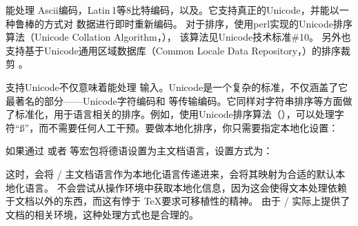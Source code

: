 \biber 能处理 Ascii编码，Latin\,1等8比特编码，以及\utf 。它支持真正的Unicode，并能以一种鲁棒的方式对 数据进行即时重新编码。
对于排序，\biber 使用perl实现的Unicode排序算法（Unicode Collation Algorithm，），
该算法见Unicode技术标准\#10。
另外也支持基于Unicode通用区域数据库（Common Locale Data Repository，）的排序裁剪
 。



支持Unicode不仅意味着能处理 \utf 输入。Unicode是一个复杂的标准，不仅涵盖了它最著名的部分——Unicode字符编码和 \utf 等传输编码。它同样对字符串排序等方面做了标准化，用于语言相关的排序。例如，使用Unicode排序算法（），\biber 可以处理字符“ß”，而不需要任何人工干预。要做本地化排序，你只需要指定本地化设置：

\begin{ltxexample}
\usepackage[sortlocale=de]{biblatex}
\end{ltxexample}
%
如果通过  或者  等宏包将德语设置为主文档语言，设置方式为：

\begin{ltxexample}
\usepackage[sortlocale=auto]{biblatex}
\end{ltxexample}
%
这时，\biblatex 会将 / 主文档语言作为本地化语言传递进来，\biber 会将其映射为合适的默认本地化语言。
\biber 不会尝试从操作环境中获取本地化信息，因为这会使得文本处理依赖于文档以外的东西，而这有悖于 \TeX 要求可移植性的精神。
由于 /  实际上提供了文档的相关环境，这种处理方式也是合理的。


